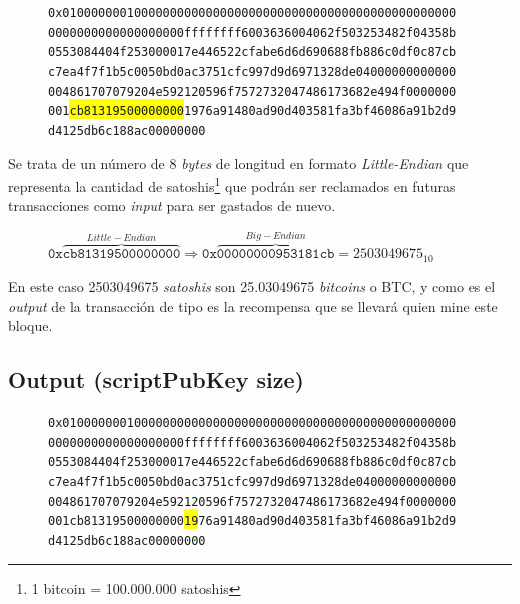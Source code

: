 \documentclass{article}
\begin{document}
    \begin{figure}[H]
        \texttt{0x0100000001000000000000000000000000000000000000000000000} \\
        \texttt{0000000000000000000ffffffff6003636004062f503253482f04358b} \\
        \texttt{0553084404f253000017e446522cfabe6d6d690688fb886c0df0c87cb} \\
        \texttt{c7ea4f7f1b5c0050bd0ac3751cfc997d9d6971328de04000000000000} \\
        \texttt{004861707079204e592120596f7572732047486173682e494f0000000} \\
        \texttt{001\colorbox{Yellow}{cb81319500000000}1976a91480ad90d403581fa3bf46086a91b2d9} \\
        \texttt{d4125db6c188ac00000000}
    \end{figure}
    
    Se trata de un número de 8 \textit{bytes} de longitud en formato \textit{Little-Endian} que representa la cantidad de satoshis\footnote{1 bitcoin = 100.000.000 satoshis} que podrán ser reclamados en futuras transacciones como \textit{input} para ser gastados de nuevo.
    \begin{figure}[H]
    \centering
        $\texttt{0x}\overbrace{\texttt{cb81319500000000}}^{Little-Endian} \Rightarrow \texttt{0x}\overbrace{\texttt{00000000953181cb}}^{Big-Endian} = 2503049675_{10}$
    \end{figure}
    
    En este caso 2503049675 \textit{satoshis} son 25.03049675 \textit{bitcoins} o BTC, y como es el \textit{output} de la transacción de tipo  es la recompensa que se llevará quien mine este bloque.
    
    \subsection{Output (scriptPubKey size)}
    
    \begin{figure}[H]
        \texttt{0x0100000001000000000000000000000000000000000000000000000} \\
        \texttt{0000000000000000000ffffffff6003636004062f503253482f04358b} \\
        \texttt{0553084404f253000017e446522cfabe6d6d690688fb886c0df0c87cb} \\
        \texttt{c7ea4f7f1b5c0050bd0ac3751cfc997d9d6971328de04000000000000} \\
        \texttt{004861707079204e592120596f7572732047486173682e494f0000000} \\
        \texttt{001cb81319500000000\colorbox{Yellow}{19}76a91480ad90d403581fa3bf46086a91b2d9} \\
        \texttt{d4125db6c188ac00000000}
    \end{figure}
    
\end{document}
